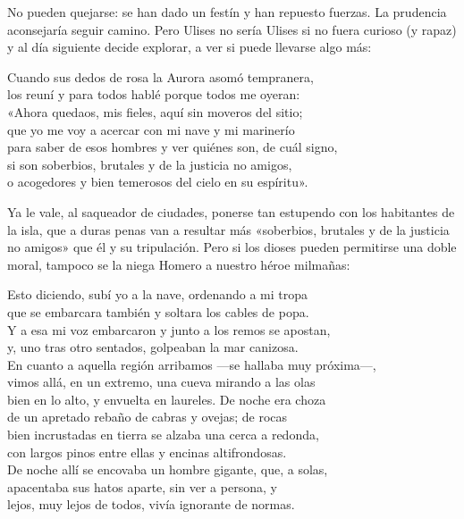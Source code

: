 No pueden quejarse: se han dado un festín y han repuesto fuerzas. La prudencia aconsejaría seguir camino. Pero Ulises no sería Ulises si no fuera curioso (y rapaz) y al día siguiente decide explorar, a ver si puede llevarse algo más:

\begin{versocita}
Cuando sus dedos de rosa la Aurora asomó tempranera,\\
los reuní y para todos hablé porque todos me oyeran:\\
«Ahora quedaos, mis fieles, aquí sin moveros del sitio;\\
que yo me voy a acercar con mi nave y mi marinerío\\
para saber de esos hombres y ver quiénes son, de cuál signo,\\
si son soberbios, brutales y de la justicia no amigos,\\
o acogedores y bien temerosos del cielo en su espíritu».
\end{versocita}

Ya le vale, al saqueador de ciudades, ponerse tan estupendo con los habitantes de la isla, que a duras penas van a resultar más «soberbios, brutales y de la justicia no amigos» que él y su tripulación. Pero si los dioses pueden permitirse una doble moral, tampoco se la niega Homero a nuestro héroe milmañas:

\begin{versocita}
Esto diciendo, subí yo a la nave, ordenando a mi tropa\\
que se embarcara también y soltara los cables de popa.\\
Y a esa mi voz embarcaron y junto a los remos se apostan,\\
y, uno tras otro sentados, golpeaban la mar canizosa.\\
En cuanto a aquella región arribamos ---se hallaba muy próxima---,\\
vimos allá, en un extremo, una cueva mirando a las olas\\
bien en lo alto, y envuelta en laureles. De noche era choza\\
de un apretado rebaño de cabras y ovejas; de rocas\\
bien incrustadas en tierra se alzaba una cerca a redonda,\\
con largos pinos entre ellas y encinas altifrondosas.\\
De noche allí se encovaba un hombre gigante, que, a solas,\\
apacentaba sus hatos aparte, sin ver a persona, y\\
lejos, muy lejos de todos, vivía ignorante de normas.
\end{versocita}

